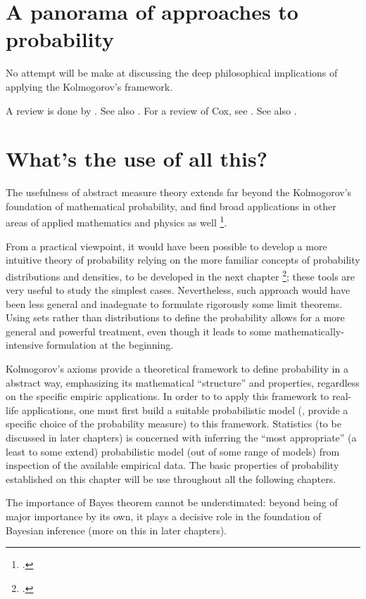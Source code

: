 \begin{refsection}
   \section{A panorama of approaches to probability}
   \label{sec:other_probability}


   No attempt will be make at discussing the deep philosophical  implications
of applying the Kolmogorov's framework.

A review is done by \cite[][\S~1]{Feller:1966}.
See also \cite{Cox:1946}.
For a review of Cox, see \cite{Van-Horn:2003}.
See also \cite{Jaynes.Bretthorst:2003}.


   \section{What's the use of all this?}

   The usefulness of abstract measure theory extends far beyond the Kolmogorov's
   foundation of mathematical probability, and find broad applications 
   in other areas of applied mathematics and physics as well%
   \footcite[Just to make one example, refer to, \eg, ][\S~13, for an application of measure-theoretical
   concepts to classical ergodic theory, chaotic dynamical systems and
   classical equilibrium statistical mechanics.]{Fasano.Marmi:2006}.


   From a practical viewpoint, it would have been possible to develop a more
   intuitive theory of probability 
    relying on 
   the more familiar concepts of probability distributions and densities, to be
   developed in
   the next chapter%
   \footcite[An example of this approch is offered by the first chapter
   of][]{Van-Kampen:2007};
   these tools are very useful to study the simplest cases. 
   Nevertheless, such approach would have been less general and 
   inadeguate to formulate rigorously some limit theorems. 
   Using sets rather than
   distributions to define the probability
   allows for a more general and powerful treatment, even though it leads to
   some mathematically-intensive formulation at the beginning.

   Kolmogorov's axioms provide a theoretical framework to define
   probability in a abstract way, emphasizing its mathematical ``structure''
   and properties,
   regardless on the specific  empiric 
   applications. 
   In order to 
   to apply this framework to real-life applications, one must first build a suitable
   probabilistic model (\ie, provide a specific choice of
   the probability measure) to this framework. 
   Statistics (to be discussed in later chapters) is concerned with inferring
   the ``most appropriate'' (a least to some extend) probabilistic model (out of some range of models) from
   inspection of the available empirical data. 
   The basic properties of probability established on this chapter will be use
   throughout all the following chapters. 

   The importance of Bayes theorem cannot be understimated: 
   beyond being of major importance by its own, it plays a decisive 
   role in the foundation of Bayesian inference (more on this in later chapters). 


\printbibliography[heading=subbibliography]
\end{refsection}
